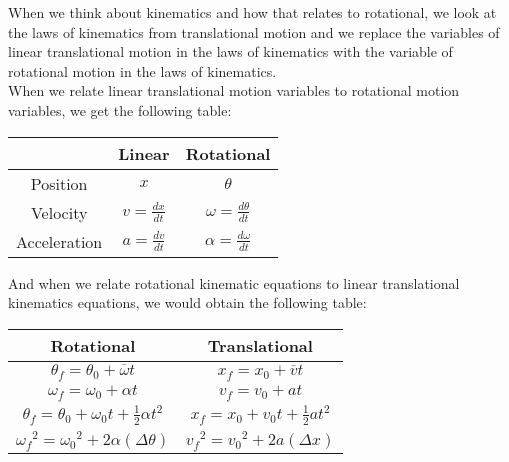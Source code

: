 \documentclass{turabian-researchpaper}
\begin{document}
When we think about kinematics and how that relates to rotational, we look at the laws of kinematics from translational motion and we replace the variables of linear translational motion in the laws of kinematics with the variable of rotational motion in the laws of kinematics. \\  

When we relate linear translational motion variables to rotational motion variables, we get the following table: \\
\vspace{0.5cm}

\begin{tabular}{|c|c|c|}
\hline
     & Linear  & Rotational \\
\hline
  Position   & \(x\)  & \(\theta\) \\
\hline
   Velocity  & $v = \frac{dx}{dt}$  & $\omega = \frac{d\theta}{dt}$  \\
\hline
  Acceleration   &  $a = \frac{dv}{dt}$ & $\alpha = \frac{d\omega}{dt}$  \\ 
  \hline 
\end{tabular} 
\vspace{0.5cm} 

And when we relate rotational kinematic equations to linear translational kinematics equations, we would obtain the following table: \\ 
\vspace{0.5cm} 

\begin{tabular}{|c|c|}
\hline
   Rotational  & Translational \\
\hline     
    $\theta_{f} = \theta_{0} + \overline{\omega}t$ & $x_{f} = x_{0} + \overline{v}t$ \\
\hline
   $\omega_{f} = \omega_{0} + {\alpha}t$ & $v_{f} = v_{0} + {a}t$ \\
\hline
 $\theta_{f} = \theta_{0} + \omega_{0}t +{\frac{1}{2}}{\alpha}t^2$   &  $x_{f} = x_{0} + v_{0}t +{\frac{1}{2}}{a}t^2$ \\
\hline
   ${\omega_{f}}^2 = {\omega_{0}}^2 + 2{\alpha}(\Delta\theta)$ & ${v_{f}}^2 = {v_{0}}^2 + 2{a}(\Delta{x})$ \\
\hline
\end{tabular}
\vspace{0.5cm} 
\end{document}
